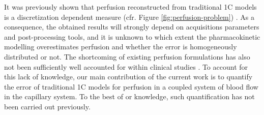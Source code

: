 \documentclass[final,5p,times,twocolumn]{elsarticle}
\begin{document}
It was previously shown that perfusion reconstructed from traditional 1C models is a discretization dependent measure (cfr. Figure \ref{fig:perfusion-problem}) \cite{Henkelman1990,Guibert2013,sourbron14}. As a consequence, the obtained results will strongly depend on acquisitions parameters and post-processing tools, and it is unknown to which extent the pharmacokinetic modelling overestimates perfusion and whether the error is homogeneously distributed or not. The shortcoming of existing perfusion formulations has also not been sufficiently well accounted for within clinical studies \cite{Mokin16,Kickingereder15}. To account for this lack of knowledge, our main contribution of the current work is to quantify the error of traditional 1C models for perfusion in a coupled system of blood flow in the capillary system. To the best of or knowledge, such quantification has not been carried out previously.
\end{document}
